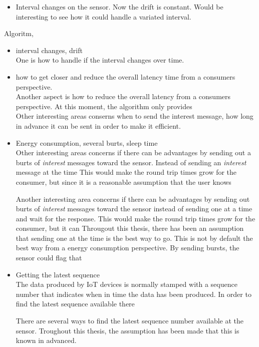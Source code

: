 \begin{itemize}
\item Interval changes on the sensor. Now the drift is constant. Would be interesting to see how it could handle a variated interval.
\end{itemize}
Algoritm, 
\begin{itemize}
\item interval changes, drift\\

One is how to handle if the interval changes over time. 
\end{itemize}
\begin{itemize}
\item how to get closer and reduce the overall latency time from a consumers perspective. \\
Another aspect is how to reduce the overall latency from a consumers perspective. At this moment, the algorithm only provides \\
Other interesting areas conserns when to send the interest message, how long in advance it can be sent in order to make it efficient. 

\end{itemize}
\begin{itemize}
\item Energy consumption, several burts, sleep time\\

Other interesting areas concerns if there can be advantages by sending out a burts of \textit{interest} messages toward the sensor. Instead of sending an \textit{interest} message at the time This would make the round trip times grow for the consumer, but since it is a reasonable assumption that the user knows 


Another interesting area concerns if there can be advantages by sending out burts of \textit{interest} messages toward the sensor instead of sending one at a time and wait for the response. This would make the round trip times grow for the consumer, but it can 
Througout this thesis, there has been an assumption that sending one at the time is the best way to go. This is not by default the best way from a energy consumption perspective.  By sending bursts, the sensor could flag that 


\end{itemize}
\begin{itemize}
\item Getting the latest sequence\\
The data produced by IoT devices is normally stamped with a sequence number that indicates when in time the data has been produced. In order to find the latest sequence available there 

There are several ways to find the latest sequence number available at the sensor. Troughout this thesis, the assumption has been made that this is known in advanced. 

\end{itemize}


